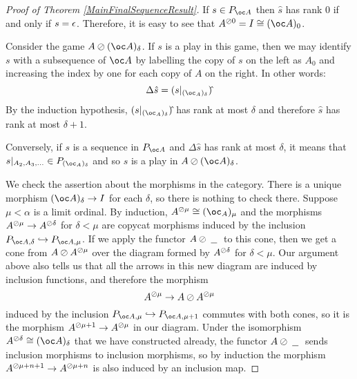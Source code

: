 \documentclass[11pt]{article} %
\begin{document}
\begin{proof}[Proof of Theorem \ref{MainFinalSequenceResult}]
  If $s\in P_{\oc A}$ then $\hat s$ has rank $0$ if and only if $s=\epsilon$.  Therefore, it is easy to see that $A^{\sequoid 0}=I\cong(\oc A)_0$.  

  Consider the game $A\sequoid (\oc A)_\delta$.  If $s$ is a play in this game, then we may identify $s$ with a subsequence of $\oc A$ by labelling the copy of $s$ on the left as $A_0$ and increasing the index by one for each copy of $A$ on the right.  In other words:
  \[
    \Delta\hat s = ({s\vert_{(\oc_A)_\delta}})\hat{}
    \]
  By the induction hypothesis, $({s\vert_{(\oc_A)_\delta}})\hat{}$ has rank at most $\delta$ and therefore $\hat s$ has rank at most $\delta+1$.  

  Conversely, if $s$ is a sequence in $P_{\oc A}$ and $\Delta\hat s$ has rank at most $\delta$, it means that $s\vert_{A_2,A_3,\dots}\in P_{(\oc_A)_\delta}$ and so $s$ is a play in $A\sequoid(\oc A)_\delta$.  

  We check the assertion about the morphisms in the category.  There is a unique morphism $(\oc A)_\delta\to I$ for each $\delta$, so there is nothing to check there.  Suppose $\mu<\alpha$ is a limit ordinal.  By induction, $A^{\sequoid\mu}\cong (\oc_A)_\mu$ and the morphisms $A^{\oslash\mu}\to A^{\oslash\delta}$ for $\delta<\mu$ are copycat morphisms induced by the inclusion $P_{\oc A, \delta}\hookrightarrow P_{\oc A,\mu}$.  If we apply the functor $A\oslash\;\underline{\hspace{1.5ex}}\;$ to this cone, then we get a cone from $A\oslash A^{\oslash \mu}$ over the diagram formed by $A^{\oslash\delta}$ for $\delta<\mu$.  Our argument above also tells us that all the arrows in this new diagram are induced by inclusion functions, and therefore the morphism
  \[
    A^{\oslash\mu}\to A\oslash A^{\oslash\mu}
    \]
  induced by the inclusion $P_{\oc A,\mu}\hookrightarrow P_{\oc A, \mu+1}$ commutes with both cones, so it is the morphism $A^{\oslash\mu+1}\to A^{\oslash\mu}$ in our diagram.  Under the isomorphism $A^{\sequoid\delta}\cong (\oc A)_\delta$ that we have constructed already, the functor $A\oslash\;\underline{\hspace{1.5ex}}\;$ sends inclusion morphisms to inclusion morphisms, so by induction the morphism $A^{\oslash\mu+n+1}\to A^{\oslash\mu+n}$ is also induced by an inclusion map.  


\end{proof}
\end{document}
